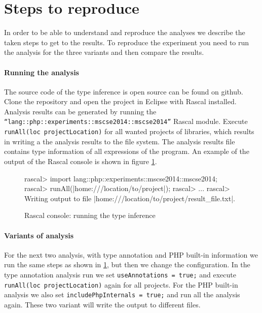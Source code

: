 \documentclass[../main.tex]{subfiles}
\begin{document}
			
	\section{Steps to reproduce}\label{sec:steps_to_reproduce}
	In order to be able to understand and reproduce the analyses we describe the taken steps to get to the results.	
	To reproduce the experiment you need to run the analysis for the three variants and then compare the results.
	
	\paragraph{Running the analysis}
	The source code of the type inference is open source can be found on github\footnotemark.
	Clone the repository and open the project in Eclipse with Rascal installed.
	Analysis results can be generated by running the \texttt{``lang::php::experiments::mscse2014::mscse2014''} Rascal module.
	Execute \texttt{runAll(loc projectLocation)} for all wanted projects of libraries, which results in writing a the analysis results to the file system.
	The analysis results file contains type information of all expressions of the program.
	An example of the output of the Rascal console is shown in figure \ref{fig:running_analysis}.
	
	\begin{figure}[H]
	\begin{boxedverbatim}
		rascal> import lang::php::experiments::mscse2014::mscse2014;             
		rascal> runAll(|home:///location/to/project|);
		rascal> ...
		rascal> Writing output to file |home:///location/to/project/result_file.txt|.
	\end{boxedverbatim}
	\caption{Rascal console: running the type inference}
		\label{fig:running_analysis}
	\end{figure}
	
	\paragraph{Variants of analysis}
	For the next two analysis, with type annotation and PHP built-in information we run the same steps as shown in \ref{fig:running_analysis}, but then we change the configuration.
	In the type annotation analysis run we set \texttt{useAnnotations = true;} and execute \texttt{runAll(loc projectLocation)} again for all projects.
	For the PHP built-in analysis we also set \texttt{includePhpInternals = true;} and run all the analysis again.
	These two variant will write the output to different files.
	
\end{document}

